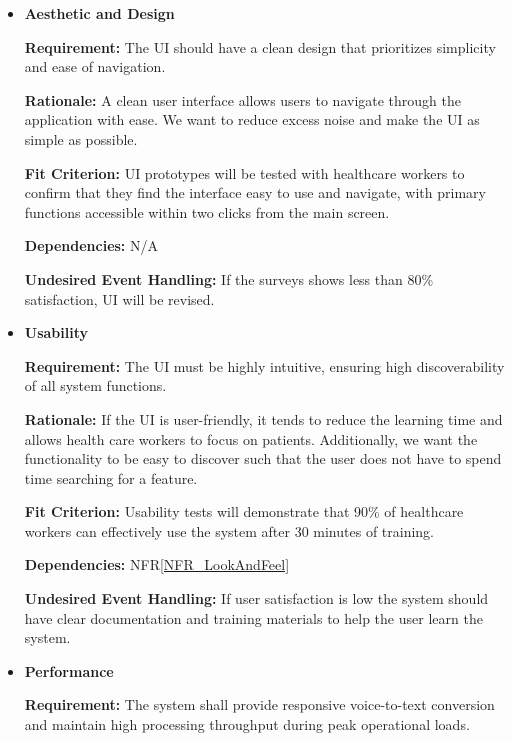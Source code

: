 \documentclass[12pt]{article}
\newcounter{nfrnum} %
\begin{document}
\noindent \begin{itemize}

\item[NFR\refstepcounter{nfrnum}\thenfrnum \label{NFR_LookAndFeel}:] \textbf{Aesthetic and Design}

    \textbf{Requirement:} The UI should have a clean design that prioritizes simplicity and ease of navigation.

    \textbf{Rationale:} A clean user interface allows users to navigate through the application with ease. We want to reduce excess noise and make the UI as simple as possible.

    \textbf{Fit Criterion:} UI prototypes will be tested with healthcare workers to confirm that they find the interface easy to use and navigate, with primary functions accessible within two clicks from the main screen.

    \textbf{Dependencies:} N/A

    \textbf{Undesired Event Handling:} If the surveys shows less than 80\% satisfaction, UI will be revised.


\item[NFR\refstepcounter{nfrnum}\thenfrnum \label{NFR_Usability}:] \textbf{Usability}

    \textbf{Requirement:} The UI must be highly intuitive, ensuring high discoverability of all system functions.

    \textbf{Rationale:} If the UI is user-friendly, it tends to reduce the learning time and allows health care workers to focus on patients. Additionally, we want the functionality to be easy to discover such that the user does not have to spend time searching for a feature.
  
    \textbf{Fit Criterion:} Usability tests will demonstrate that 90\% of healthcare workers can effectively use the system after 30 minutes of training.

    \textbf{Dependencies:} NFR\ref{NFR_LookAndFeel}

    \textbf{Undesired Event Handling:} If user satisfaction is low the system should have clear documentation and training materials to help the user learn the system.

\item[NFR\refstepcounter{nfrnum}\thenfrnum \label{NFR_Performance}:] \textbf{Performance}

    \textbf{Requirement:} The system shall provide responsive voice-to-text conversion and maintain high processing throughput during peak operational loads.


\end{itemize}
\end{document}
